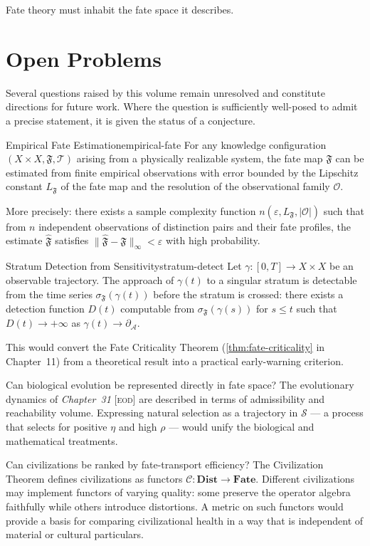 \documentclass[12pt,twoside,openright]{book}
\newcommand{\transfam}{\mathcal{T}}       %
\newcommand{\distPairs}{X\times X}
\newcommand{\obs}{\mathcal{O}}
\newcommand{\fateMap}{\mathfrak{F}}
\newcommand{\fateSpace}{\mathcal{S}}
\newcommand{\survRatio}{\rho}             %
\newcommand{\repEff}{\eta}               %
\newcommand{\EOD}[1]{\textit{#1} [\textsc{eod}]}
\newcommand{\fateSens}[1]{\sigma_{\fateMap}(#1)}
\newcommand{\singSet}{\partial_{\!\mathcal{A}}}
\newcommand{\fateLip}{L_{\fateMap}}
\newcommand{\catDist}{\mathbf{Dist}}
\newcommand{\catFate}{\mathbf{Fate}}
\newcommand{\civFunc}{\mathcal{C}}
\providecommand{\fateSens}[1]{\sigma_{\fateMap}(#1)}
\providecommand{\singSet}{\partial_{\!\mathcal{A}}}
\providecommand{\fateLip}{L_{\fateMap}}
\providecommand{\catDist}{\mathbf{Dist}}
\providecommand{\catFate}{\mathbf{Fate}}
\providecommand{\civFunc}{\mathcal{C}}
\begin{document}
Fate theory must inhabit the fate space it describes.

\section{Open Problems}

Several questions raised by this volume remain unresolved and
constitute directions for future work. Where the question is
sufficiently well-posed to admit a precise statement, it is
given the status of a conjecture.

\begin{conjecture}{Empirical Fate Estimation}{empirical-fate}
For any knowledge configuration $(X\times X, \fateMap,
\transfam)$ arising from a physically realizable system, the
fate map $\fateMap$ can be estimated from finite empirical
observations with error bounded by the Lipschitz constant
$\fateLip$ of the fate map and the resolution of the
observational family $\obs$.

More precisely: there exists a sample complexity function
$n(\varepsilon, \fateLip, |\obs|)$ such that from $n$
independent observations of distinction pairs and their
fate profiles, the estimate $\hat{\fateMap}$ satisfies
$\|\hat{\fateMap}-\fateMap\|_\infty < \varepsilon$ with
high probability.
\end{conjecture}

\begin{conjecture}{Stratum Detection from Sensitivity}{stratum-detect}
Let $\gamma:[0,T]\to\distPairs$ be an observable trajectory.
The approach of $\gamma(t)$ to a singular stratum is detectable
from the time series $\fateSens{\gamma(t)}$ before the stratum
is crossed: there exists a detection function $D(t)$ computable
from $\fateSens{\gamma(s)}$ for $s\leq t$ such that
$D(t)\to+\infty$ as $\gamma(t)\to\singSet$.

This would convert the Fate Criticality Theorem
(\cref{thm:fate-criticality} in Chapter~11) from a theoretical
result into a practical early-warning criterion.
\end{conjecture}

Can biological evolution be represented directly in fate space?
The evolutionary dynamics of \EOD{Chapter~31} are described in
terms of admissibility and reachability volume. Expressing
natural selection as a trajectory in $\fateSpace$ --- a process
that selects for positive $\repEff$ and high $\survRatio$ ---
would unify the biological and mathematical treatments.

Can civilizations be ranked by fate-transport efficiency? The
Civilization Theorem defines civilizations as functors
$\civFunc:\catDist\to\catFate$. Different civilizations may
implement functors of varying quality: some preserve the
operator algebra faithfully while others introduce distortions.
A metric on such functors would provide a basis for comparing
civilizational health in a way that is independent of material
or cultural particulars.
\end{document}
